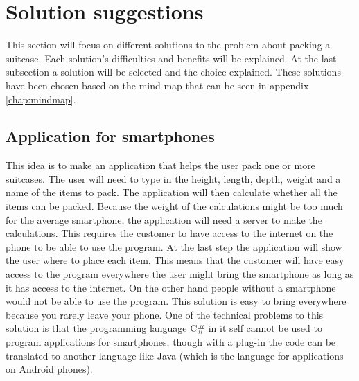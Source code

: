 \section{Solution suggestions} 	
This section will focus on different solutions to the problem about packing a suitcase. Each solution's difficulties and benefits will be explained. At the last subsection a solution will be selected and the choice explained. These solutions have been chosen based on the mind map that can be seen in appendix  \ref{chap:mindmap}.

\subsection{Application for smartphones}
This idea is to make an application that helps the user pack one or more suitcases. The user will need to type in the height, length, depth, weight and a name of the items to pack. The application will then calculate whether all the items can be packed. Because the weight of the calculations might be too much for the average smartphone, the application will need a server to make the calculations. This requires the customer to have access to the internet on the phone to be able to use the program. At the last step the application will show the user where to place each item. This means that the customer will have easy access to the program everywhere the user might bring the smartphone as long as it has access to the internet. On the other hand people without a smartphone would not be able to use the program. This solution is easy to bring everywhere because you rarely leave your phone. One of the technical problems to this solution is that the programming language C\# in it self cannot be used to program applications for smartphones, though with a plug-in the code can be translated to another language like Java (which is the language for applications on Android phones).

